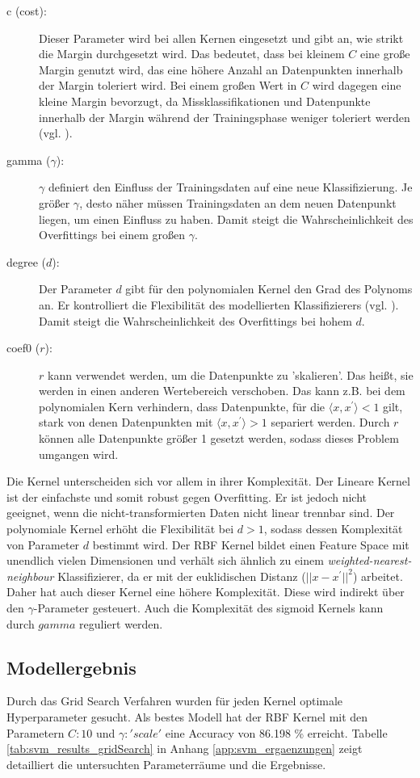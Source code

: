 \begin{description}
	\item[c (cost):]
	Dieser Parameter wird bei allen Kernen eingesetzt und gibt an, wie strikt die Margin durchgesetzt wird. Das bedeutet, dass bei kleinem $C$ eine große Margin genutzt wird, das eine höhere Anzahl an Datenpunkten innerhalb der Margin toleriert wird. Bei einem großen Wert in $C$ wird dagegen eine kleine Margin bevorzugt, da Missklassifikationen und Datenpunkte innerhalb der Margin während der Trainingsphase weniger toleriert werden (vgl. \cite{2015_aggarwal}).
	\item[gamma ($\gamma$):]
	$\gamma$ definiert den Einfluss der Trainingsdaten auf eine neue Klassifizierung. Je größer $\gamma$, desto näher müssen Trainingsdaten an dem neuen Datenpunkt liegen, um einen Einfluss zu haben. Damit steigt die Wahrscheinlichkeit des Overfittings bei einem großen $\gamma$.
	\item[degree ($d$):]
	Der Parameter $d$ gibt für den polynomialen Kernel den Grad des Polynoms an. Er kontrolliert die Flexibilität des modellierten Klassifizierers (vgl. \cite{2009_ben_hur}). Damit steigt die Wahrscheinlichkeit des Overfittings bei hohem $d$.
	\item[coef0 ($r$):]
	$r$ kann verwendet werden, um die Datenpunkte zu 'skalieren'. Das heißt, sie werden in einen anderen Wertebereich verschoben. Das kann z.B. bei dem polynomialen Kern verhindern, dass Datenpunkte, für die $\langle x,x^{'}\rangle<1$ gilt, stark von denen Datenpunkten mit $\langle x,x^{'}\rangle > 1$ separiert werden. Durch $r$ können alle Datenpunkte größer 1 gesetzt werden, sodass dieses Problem umgangen wird.
\end{description}
Die Kernel unterscheiden sich vor allem in ihrer Komplexität. Der Lineare Kernel ist der einfachste und somit robust gegen Overfitting. Er ist jedoch nicht geeignet, wenn die nicht-transformierten Daten nicht linear trennbar sind. Der polynomiale Kernel erhöht die Flexibilität bei $d>1$, sodass dessen Komplexität von Parameter $d$ bestimmt wird. Der RBF Kernel bildet einen Feature Space mit unendlich vielen Dimensionen und verhält sich ähnlich zu einem \emph{weighted-nearest-neighbour} Klassifizierer, da er mit der euklidischen Distanz ($||x-x^{'}||^{2}$) arbeitet. Daher hat auch dieser Kernel eine höhere Komplexität. Diese wird indirekt über den $\gamma$-Parameter gesteuert. Auch die Komplexität des sigmoid Kernels kann durch $gamma$ reguliert werden.
\subsection{Modellergebnis}
Durch das Grid Search Verfahren wurden für jeden Kernel optimale Hyperparameter gesucht. Als bestes Modell hat der RBF Kernel mit den Parametern $C: 10$ und $\gamma: 'scale'$ eine Accuracy von 86.198 \% erreicht. Tabelle \ref{tab:svm_results_gridSearch} in Anhang \ref{app:svm_ergaenzungen} zeigt detailliert die untersuchten Parameterräume und die Ergebnisse.
